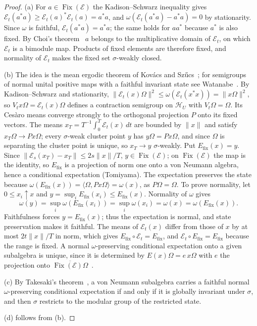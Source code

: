 \documentclass[12pt]{article}
\theoremstyle{definition}
\theoremstyle{remark}
\newcommand{\Fix}{\operatorname{Fix}}
\begin{document}
\begin{proof}
(a) For \(a\in\Fix(\mathcal E)\) the Kadison--Schwarz inequality gives
\(\mathcal E_t(a^*a)\ge\mathcal E_t(a)^*\mathcal E_t(a)=a^*a\), and
\(\omega(\mathcal E_t(a^*a)-a^*a)=0\) by stationarity. Since \(\omega\) is faithful,
\(\mathcal E_t(a^*a)=a^*a\); the same holds for \(aa^*\) because \(a^*\) is also fixed.
By Choi's theorem~\cite{Choi1974} \(a\) belongs to the multiplicative domain of
\(\mathcal E_t\), on which \(\mathcal E_t\) is a bimodule map. Products of fixed
elements are therefore fixed, and normality of \(\mathcal E_t\) makes the fixed set
\(\sigma\)-weakly closed.

(b) The idea is the mean ergodic theorem of Kov\'acs and Sz\H{u}cs~\cite{KovacsSzucs1966}; for semigroups of normal unital positive maps with a faithful invariant state see Watanabe~\cite{Watanabe1979}.
By Kadison--Schwarz and stationarity,
\(\|\mathcal E_t(x)\Omega\|^2\le\omega(\mathcal E_t(x^*x))=\|x\Omega\|^2\), so
\(V_tx\Omega=\mathcal E_t(x)\Omega\) defines a contraction semigroup on
\(\mathcal H_U\) with \(V_t\Omega=\Omega\). Its Ces\`aro means converge strongly to the
orthogonal projection \(P\) onto its fixed vectors. The means
\(x_T=T^{-1}\int_0^T\mathcal E_t(x)\,dt\) are bounded by \(\|x\|\) and satisfy
\(x_T\Omega\to Px\Omega\); every \(\sigma\)-weak cluster point \(y\) has \(y\Omega=Px\Omega\),
and since \(\Omega\) is separating the cluster point is unique, so \(x_T\to y\)
\(\sigma\)-weakly. Put \(E_{\mathrm{fix}}(x)=y\). Since
\(\|\mathcal E_s(x_T)-x_T\|\le2s\|x\|/T\), \(y\in\Fix(\mathcal E)\); on
\(\Fix(\mathcal E)\) the map is the identity, so \(E_{\mathrm{fix}}\) is a projection of
norm one onto a von Neumann algebra, hence a conditional expectation (Tomiyama). The expectation preserves the state because
\(\omega(E_{\mathrm{fix}}(x))=\langle\Omega,Px\Omega\rangle=\omega(x)\), as \(P\Omega=\Omega\).
To prove normality, let \(0\le x_i\uparrow x\) and
\(y=\sup_iE_{\mathrm{fix}}(x_i)\le E_{\mathrm{fix}}(x)\).
Normality of \(\omega\) gives
\[
\omega(y)=\sup_i\omega(E_{\mathrm{fix}}(x_i))
=\sup_i\omega(x_i)=\omega(x)=\omega(E_{\mathrm{fix}}(x)).
\]
Faithfulness forces \(y=E_{\mathrm{fix}}(x)\); thus the expectation is normal,
and state preservation makes it faithful. The means of
\(\mathcal E_t(x)\) differ from those of \(x\) by at most \(2t\|x\|/T\) in norm, which
gives \(E_{\mathrm{fix}}\circ\mathcal E_t=E_{\mathrm{fix}}\), and
\(\mathcal E_t\circ E_{\mathrm{fix}}=E_{\mathrm{fix}}\) because the range is fixed. A
normal \(\omega\)-preserving conditional expectation onto a given subalgebra is unique,
since it is determined by \(E(x)\Omega=e\,x\Omega\) with \(e\) the projection onto
\(\overline{\Fix(\mathcal E)\Omega}\)~\cite{Takesaki1972}.

(c) By Takesaki's theorem~\cite{Takesaki1972}, a von Neumann subalgebra carries a
faithful normal \(\omega\)-preserving conditional expectation if and only if it is
globally invariant under \(\sigma\), and then \(\sigma\) restricts to the modular group
of the restricted state.

(d) follows from (b).
\end{proof}
\end{document}
